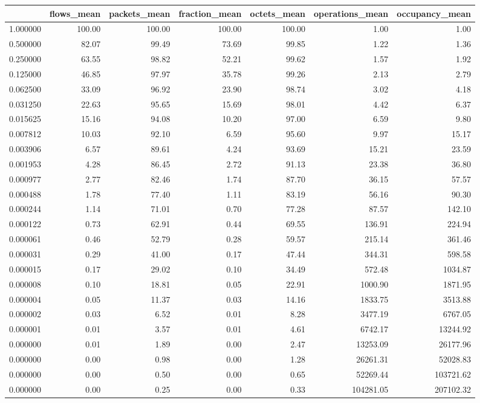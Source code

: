 \begin{tabular}{lrrrrrr}
\toprule
 & flows_mean & packets_mean & fraction_mean & octets_mean & operations_mean & occupancy_mean \\
\midrule
1.000000 & 100.00 & 100.00 & 100.00 & 100.00 & 1.00 & 1.00 \\
0.500000 & 82.07 & 99.49 & 73.69 & 99.85 & 1.22 & 1.36 \\
0.250000 & 63.55 & 98.82 & 52.21 & 99.62 & 1.57 & 1.92 \\
0.125000 & 46.85 & 97.97 & 35.78 & 99.26 & 2.13 & 2.79 \\
0.062500 & 33.09 & 96.92 & 23.90 & 98.74 & 3.02 & 4.18 \\
0.031250 & 22.63 & 95.65 & 15.69 & 98.01 & 4.42 & 6.37 \\
0.015625 & 15.16 & 94.08 & 10.20 & 97.00 & 6.59 & 9.80 \\
0.007812 & 10.03 & 92.10 & 6.59 & 95.60 & 9.97 & 15.17 \\
0.003906 & 6.57 & 89.61 & 4.24 & 93.69 & 15.21 & 23.59 \\
0.001953 & 4.28 & 86.45 & 2.72 & 91.13 & 23.38 & 36.80 \\
0.000977 & 2.77 & 82.46 & 1.74 & 87.70 & 36.15 & 57.57 \\
0.000488 & 1.78 & 77.40 & 1.11 & 83.19 & 56.16 & 90.30 \\
0.000244 & 1.14 & 71.01 & 0.70 & 77.28 & 87.57 & 142.10 \\
0.000122 & 0.73 & 62.91 & 0.44 & 69.55 & 136.91 & 224.94 \\
0.000061 & 0.46 & 52.79 & 0.28 & 59.57 & 215.14 & 361.46 \\
0.000031 & 0.29 & 41.00 & 0.17 & 47.44 & 344.31 & 598.58 \\
0.000015 & 0.17 & 29.02 & 0.10 & 34.49 & 572.48 & 1034.87 \\
0.000008 & 0.10 & 18.81 & 0.05 & 22.91 & 1000.90 & 1871.95 \\
0.000004 & 0.05 & 11.37 & 0.03 & 14.16 & 1833.75 & 3513.88 \\
0.000002 & 0.03 & 6.52 & 0.01 & 8.28 & 3477.19 & 6767.05 \\
0.000001 & 0.01 & 3.57 & 0.01 & 4.61 & 6742.17 & 13244.92 \\
0.000000 & 0.01 & 1.89 & 0.00 & 2.47 & 13253.09 & 26177.96 \\
0.000000 & 0.00 & 0.98 & 0.00 & 1.28 & 26261.31 & 52028.83 \\
0.000000 & 0.00 & 0.50 & 0.00 & 0.65 & 52269.44 & 103721.62 \\
0.000000 & 0.00 & 0.25 & 0.00 & 0.33 & 104281.05 & 207102.32 \\
\bottomrule
\end{tabular}
